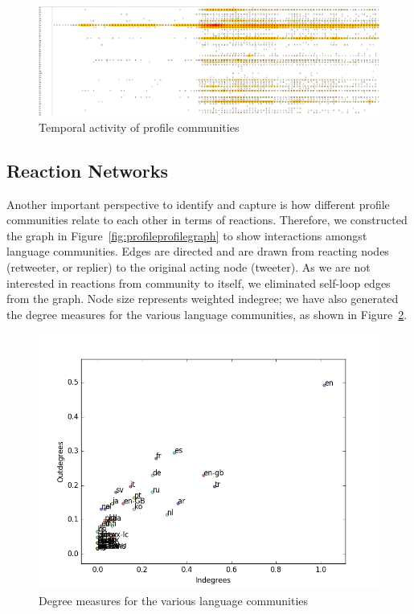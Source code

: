 \documentclass[conference]{IEEEtran}
\begin{document}
\begin{figure}[!h]
\centering
\includegraphics[width=\textwidth]{images/heatmap.png}
\caption{Temporal activity of profile communities}
\label{fig:heatmap}
\end{figure}


\subsection{Reaction Networks}\label{reactionnetworks}

Another important perspective to identify and capture is how different
profile communities relate to each other in terms of
reactions. Therefore, we constructed the graph in
Figure~\ref{fig:profileprofilegraph} to show interactions amongst
language communities. Edges are directed and are drawn from reacting
nodes (retweeter, or replier) to the original acting node
(tweeter). As we are not interested in reactions from community to
itself, we eliminated self-loop edges from the graph. Node size
represents weighted indegree; we have also generated the degree
measures for the various language communities, as shown in
Figure~\ref{fig:inoutdegree}.

\begin{figure}[!htb]
\centering
\includegraphics[width=\columnwidth]{images/indegreeoutdegree.png}
\caption{Degree measures for the various language communities}
\label{fig:inoutdegree}
\end{figure}
\end{document}
